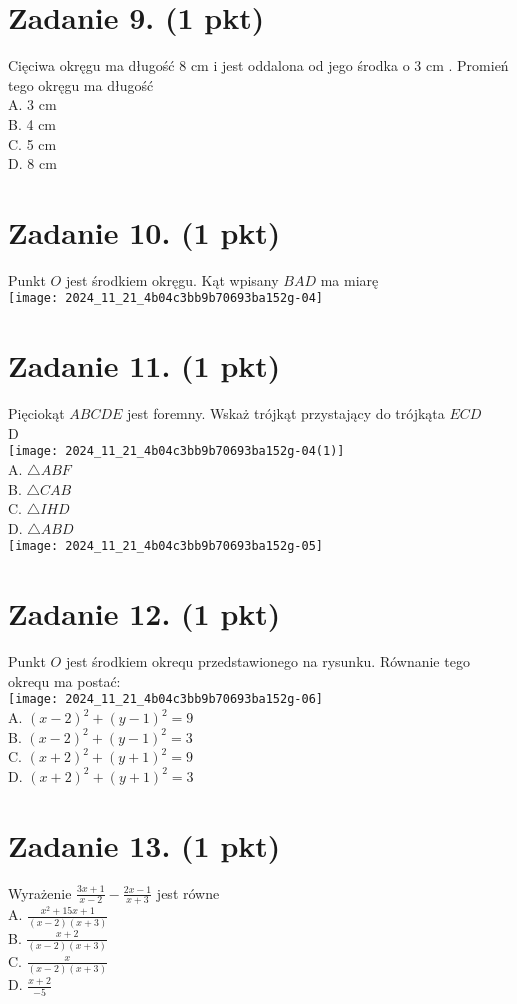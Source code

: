 \documentclass[10pt]{article}
\begin{document}
\section*{Zadanie 9. (1 pkt)}
Cięciwa okręgu ma długość 8 cm i jest oddalona od jego środka o 3 cm . Promień tego okręgu ma długość\\
A. 3 cm\\
B. 4 cm\\
C. 5 cm\\
D. 8 cm

\section*{Zadanie 10. (1 pkt)}
Punkt \(O\) jest środkiem okręgu. Kąt wpisany \(B A D\) ma miarę\\
\texttt{[image: 2024\_11\_21\_4b04c3bb9b70693ba152g-04]}

\section*{Zadanie 11. (1 pkt)}
Pięciokąt \(A B C D E\) jest foremny. Wskaż trójkąt przystający do trójkąta \(E C D\)\\
D\\
\texttt{[image: 2024\_11\_21\_4b04c3bb9b70693ba152g-04(1)]}\\
A. \(\triangle A B F\)\\
B. \(\triangle C A B\)\\
C. \(\triangle I H D\)\\
D. \(\triangle A B D\)\\
\texttt{[image: 2024\_11\_21\_4b04c3bb9b70693ba152g-05]}

\section*{Zadanie 12. (1 pkt)}
Punkt \(O\) jest środkiem okrequ przedstawionego na rysunku. Równanie tego okrequ ma postać:\\
\texttt{[image: 2024\_11\_21\_4b04c3bb9b70693ba152g-06]}\\
A. \((x-2)^{2}+(y-1)^{2}=9\)\\
B. \((x-2)^{2}+(y-1)^{2}=3\)\\
C. \((x+2)^{2}+(y+1)^{2}=9\)\\
D. \((x+2)^{2}+(y+1)^{2}=3\)

\section*{Zadanie 13. (1 pkt)}
Wyrażenie \(\frac{3 x+1}{x-2}-\frac{2 x-1}{x+3}\) jest równe\\
A. \(\frac{x^{2}+15 x+1}{(x-2)(x+3)}\)\\
B. \(\frac{x+2}{(x-2)(x+3)}\)\\
C. \(\frac{x}{(x-2)(x+3)}\)\\
D. \(\frac{x+2}{-5}\)
\end{document}
